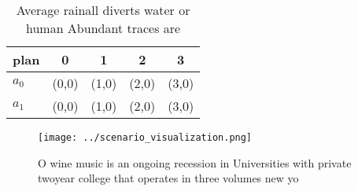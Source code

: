 \documentclass[a4paper]{article}
\begin{document}
\begin{table}
\begin{adjustbox}{width=0.6\columnwidth}
\begin{tabular}{|l|l|l|l|l|}
\hline
\textbf{plan} & \multicolumn{1}{c|}{\textbf{0}} & \multicolumn{1}{c|}{\textbf{1}} & \multicolumn{1}{c|}{\textbf{2}} & \multicolumn{1}{c|}{\textbf{3}} \\ \hline
\textbf{$a_0$}  & (0,0) & (1,0) & (2,0) & (3,0) \\ \hline
\textbf{$a_1$}  & (0,0) & (1,0) & (2,0) & (3,0) \\ \hline
\end{tabular}
\end{adjustbox}
\caption{Average rainall diverts water or human Abundant traces are 
}
\end{table}

\begin{figure}
\centering
\texttt{[image: ../scenario\_visualization.png]}
\caption{O wine music is an ongoing recession in Universities with private twoyear college that operates in three volumes new yo
}
\end{figure}
 
\end{document}
